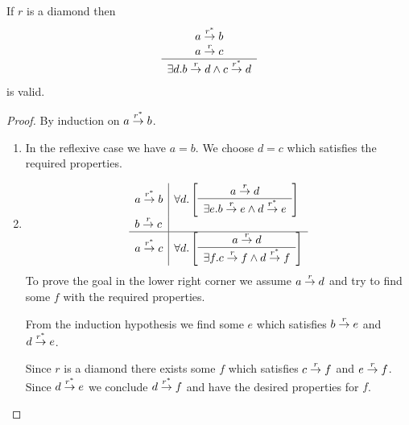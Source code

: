 \begin{lemma}
    \label{StripeLemma1}
    If $r$ is a diamond then
    $$
    \begin{array}{c} 
        a \stackrel{r^*}{\to} b
        \\
        a \stackrel{r}{\to} c
     \\ \hline 
        \exists d. b \stackrel{r}{\to} d \land c \stackrel{r^*}{\to} d
    \end{array}
    $$
    is valid.

    \begin{proof}
        By induction on $a \stackrel{r^*}{\to} b$.

        \begin{enumerate}
        \item In the reflexive case we have $a = b$. We choose $d = c$ which
        satisfies the required properties.

        \item
        $$
        \begin{array}{l|l}
            a \stackrel{r^*}{\to} b
            &
            \forall d.
            \left[
            \begin{array}{c} 
                a \stackrel{r}{\to} d
             \\ \hline 
                \exists e. b \stackrel{r}{\to} e \land d \stackrel{r^*}{\to} e
            \end{array}
            \right]
            \\
            b \stackrel{r}{\to} c
            \\
            \hline
            a \stackrel{r^*}{\to} c
            &
            \forall d.
            \left[
            \begin{array}{c} 
                a \stackrel{r}{\to} d
             \\ \hline 
                \exists f. c \stackrel{r}{\to} f \land d \stackrel{r^*}{\to} f
            \end{array}
            \right]
        \end{array}
        $$
        To prove the goal in the lower right corner we assume $a \stackrel{r}{\to} d$ and
        try to find some $f$ with the required properties.

        From the induction hypothesis we find some $e$ which satisfies $b \stackrel{r}{\to} e$ and $d \stackrel{r^*}{\to} e$.

        Since $r$ is a diamond there exists some $f$ which satisfies $c \stackrel{r}{\to}
        f$ and $e \stackrel{r}{\to} f$. Since $d \stackrel{r^*}{\to} e$ we conclude $d
        \stackrel{r^*}{\to} f$ and have the desired properties for $f$.
        \end{enumerate}
    \end{proof}

\end{lemma}



